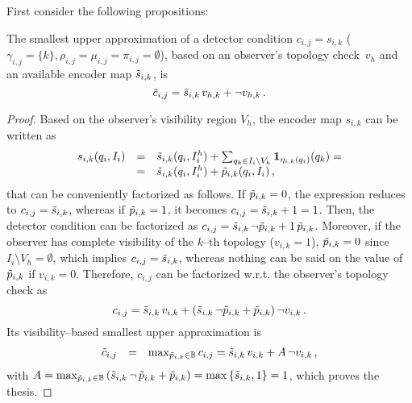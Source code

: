 First consider the following propositions:
\begin{proposition}
\label{prop:or-atom}
The smallest upper approximation of a detector condition $c_{i,j}=s_{i,k}$ ($\gamma_{i,j}=\{k\}, \rho_{i,j}=\mu_{i,j}=\pi_{i,j}=\emptyset$), based on an observer's topology check~$v_h$ and an available encoder map $\tilde{s}_{i,k}$, is
$$
\tilde{c}_{i,j} =  \tilde{s}_{i,k} \, v_{h,k} + \neg v_{h,k} \, .
$$
\begin{proof}
Based on the observer's visibility region $V_h$, the encoder map $s_{i,k}$ can be written as 
\begin{equation*}
\begin{array}{rcl}
s_{i,k}(q_i, I_i)
& = & \tilde{s}_{i,k}(q_i, I_i^h) + \sum_{q_k \in I_i \setminus V_h} {\bf 1}_{\eta_{i,k}(q_i)}(q_k) = \\
& = & \tilde{s}_{i,k}(q_i, I_i^h) + \tilde{p}_{i,k}(q_i, I_i) \, ,
\end{array}
\end{equation*}
that can be conveniently factorized as follows. If $\tilde{p}_{i,k} = 0$, the expression reduces to $c_{i,j} = \tilde{s}_{i,k}$, whereas if $\tilde{p}_{i,k} = 1$, it becomes $c_{i,j} = \tilde{s}_{i,k} + 1 = 1$. Then, the detector condition can be factorized as $c_{i,j} = \tilde{s}_{i,k} \, \neg \tilde{p}_{i,k} + 1 \, \tilde{p}_{i,k}$. Moreover, if the observer has complete visibility of the $k$--th topology ($v_{i,k}=1$), $\tilde{p}_{i,k} = 0$ since $I_i \setminus V_h = \emptyset$, which implies $c_{i,j} = \tilde{s}_{i,k}$, whereas nothing can be said on the value of $\tilde{p}_{i,k}$ if $v_{i,k}=0$. Therefore, $c_{i,j}$ can be factorized w.r.t. the observer's topology check as
\begin{equation*}
c_{i,j} = \tilde{s}_{i,k} \, v_{i,k} + \left( \tilde{s}_{i,k} \, \neg \tilde{p}_{i,k} + \tilde{p}_{i,k} \right) \neg v_{i,k} \, .
\end{equation*}
Its visibility--based smallest upper approximation is
\begin{equation*}
\begin{array}{rcl}
\tilde{c}_{i,j} & = & \max_{\tilde{p}_{i,k} \in \Bbb{B}} c_{i,j} = \tilde{s}_{i,k} \, v_{i,k} + A \, \neg v_{i,k} \, , \\
\end{array}
\end{equation*}
with $A=\max_{\tilde{p}_{i,k} \in \Bbb{B}} \left( \tilde{s}_{i,k} \, \neg \, \tilde{p}_{i,k} + \tilde{p}_{i,k}\right) = \max \left\lbrace \tilde{s}_{i,k}, 1 \right\rbrace = 1$, which proves the thesis.
\end{proof}
\end{proposition}

